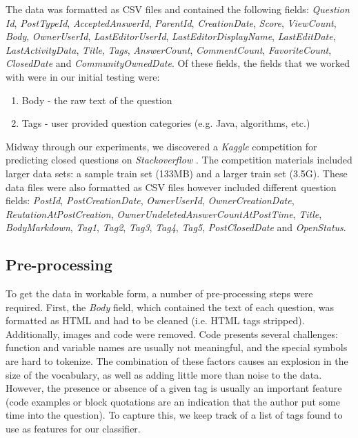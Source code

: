 \documentclass[11pt]{article}
\begin{document}
The data was formatted as CSV files and contained the following
fields: \emph{Question Id}, \emph{PostTypeId}, \emph{AcceptedAnswerId}, \emph{ParentId},
\emph{CreationDate}, \emph{Score}, \emph{ViewCount}, \emph{Body}, \emph{OwnerUserId}, \emph{LastEditorUserId}, \emph{LastEditorDisplayName}, \emph{LastEditDate}, \emph{LastActivityData}, \emph{Title}, \emph{Tags},
\emph{AnswerCount}, \emph{CommentCount}, \emph{FavoriteCount}, \emph{ClosedDate} and
\emph{CommunityOwnedDate}. Of these fields, the fields that we worked with
were in our initial testing were:

\begin{enumerate}
  \item Body - the raw text of the question
  \item Tags - user provided question categories (e.g. Java,
    algorithms, etc.)
\end{enumerate}

Midway through our experiments, we discovered a \emph{Kaggle}
competition for predicting closed questions on \emph{Stackoverflow}
\cite{website:kaggle}. The competition materials included larger data sets: a
sample train set (133MB) and a larger train set (3.5G).  These data
files were also formatted as CSV files however included different
question fields: \emph{PostId}, \emph{PostCreationDate}, \emph{OwnerUserId},
\emph{OwnerCreationDate}, \emph{ReutationAtPostCreation},
\emph{OwnerUndeletedAnswerCountAtPostTime}, \emph{Title}, \emph{BodyMarkdown}, \emph{Tag1}, \emph{Tag2},
\emph{Tag3}, \emph{Tag4}, \emph{Tag5}, \emph{PostClosedDate} and \emph{OpenStatus}.

\subsection{Pre-processing}
To get the data in workable form, a number of pre-processing steps
were required. First, the \emph{Body} field, which contained the text of
each question, was formatted as HTML and had to be
cleaned (i.e. HTML tags stripped). Additionally, images and code were
removed. Code presents several challenges: function and variable names are usually not meaningful, and the special symbols are hard to tokenize. The combination of these factors causes an explosion in the size of the vocabulary, as well as adding little more than noise to the data. However, the presence or absence of a given tag is usually an important feature (code examples or block quotations are an indication that the author put some time into the question). To capture this, we keep track of a list of tags found to use as features for our classifier.
\end{document}
